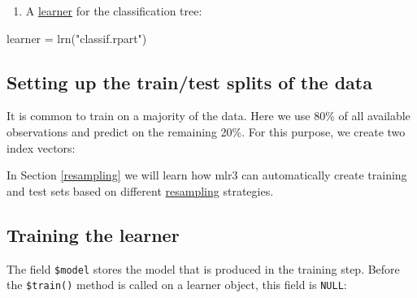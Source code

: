 \documentclass[
]{scrbook}
\newenvironment{Shaded}{\begin{snugshade}}{\end{snugshade}}
\newcommand{\FloatTok}[1]{\textcolor[rgb]{0.00,0.00,0.81}{#1}}
\newcommand{\FunctionTok}[1]{\textcolor[rgb]{0.00,0.00,0.00}{#1}}
\newcommand{\NormalTok}[1]{#1}
\newcommand{\OtherTok}[1]{\textcolor[rgb]{0.56,0.35,0.01}{#1}}
\newcommand{\SpecialCharTok}[1]{\textcolor[rgb]{0.00,0.00,0.00}{#1}}
\newcommand{\StringTok}[1]{\textcolor[rgb]{0.31,0.60,0.02}{#1}}
\providecommand{\tightlist}{%
  \setlength{\itemsep}{0pt}\setlength{\parskip}{0pt}}
\renewenvironment{Shaded} {\begin{snugshade}\small} {\end{snugshade}}
\begin{document}
\begin{enumerate}
\def\labelenumi{\arabic{enumi}.}
\setcounter{enumi}{1}
\tightlist
\item
  A \protect\hyperlink{learners}{learner} for the classification tree:
\end{enumerate}

\begin{Shaded}
\begin{Highlighting}[]
\NormalTok{learner }\OtherTok{=} \FunctionTok{lrn}\NormalTok{(}\StringTok{"classif.rpart"}\NormalTok{)}
\end{Highlighting}
\end{Shaded}

\hypertarget{split-data}{%
\subsection{Setting up the train/test splits of the data}\label{split-data}}

It is common to train on a majority of the data.
Here we use 80\% of all available observations and predict on the remaining 20\%.
For this purpose, we create two index vectors:

\begin{Shaded}
\end{Shaded}

In Section \ref{resampling} we will learn how mlr3 can automatically create training and test sets based on different \protect\hyperlink{resampling}{resampling} strategies.

\hypertarget{training}{%
\subsection{Training the learner}\label{training}}

The field \texttt{\$model} stores the model that is produced in the training step.
Before the \texttt{\$train()} method is called on a learner object, this field is \texttt{NULL}:

\begin{Shaded}
\end{Shaded}
\end{document}
